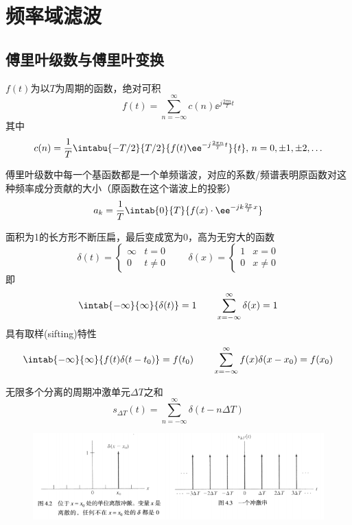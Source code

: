 
\section{频率域滤波}
\subsection{傅里叶级数与傅里叶变换}
\begin{definition}[傅里叶级数]
$f(t)$为以$T$为周期的函数，绝对可积
\[f(t)=\sum_{n=-\infty}^{\infty}c(n)\ee^{j\frac{2\pi n}{T}t}\]
其中
\[c(n)=\frac{1}{T}\intabu{-T/2}{T/2}{f(t)\ee^{-j\frac{2\pi n}{T}t}}{t},\,n=0,\pm 1,\pm 2,\ldots\]
\end{definition}

傅里叶级数中每一个基函数都是一个单频谐波，对应的系数/频谱表明原函数对这种频率成分贡献的大小（原函数在这个谐波上的投影）
\[a_k=\frac{1}{T}\intab{0}{T}{f(x)\cdot\ee^{-jk\frac{2\pi}{T}x}}\]

\begin{definition}
面积为1的长方形不断压扁，最后变成宽为0，高为无穷大的函数
\[\delta(t)=\begin{cases}
\infty & t=0\\
0 & t\ne 0
\end{cases}\qquad
\delta(x)=\begin{cases}
1 & x=0\\
0 & x\ne 0
\end{cases}\]
即
\[\intab{-\infty}{\infty}{\delta(t)}=1
\qquad
\sum_{x=-\infty}^{\infty}\delta(x)=1\]
具有取样(sifting)特性
\[\intab{-\infty}{\infty}{f(t)\delta(t-t_0)}=f(t_0)
\qquad
\sum_{x=-\infty}^{\infty}f(x)\delta(x-x_0)=f(x_0)\]
\end{definition}
\begin{definition}[冲激串]
无限多个分离的周期冲激单元$\Delta T$之和
\[s_{\Delta T}(t)=\sum_{n=-\infty}^{\infty}\delta(t-n\Delta T)\]
\end{definition}
\begin{figure}[H]
\centering
\includegraphics[width=0.8\linewidth]{fig/impulse.png}
\end{figure}

